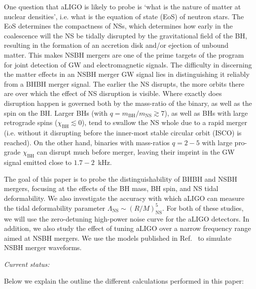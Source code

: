 \documentclass[aps,prd,amsmath,floats,floatfix, twocolumn,
superscriptaddress,nofootinbib,showpacs]{revtex4-1}
\newcommand{\prayush}{\textcolor{red!40!black}}
\newcommand{\NS}{\mathrm{NS}}
\begin{document}
One question that aLIGO is likely to probe is `what is the nature of
matter at nuclear densities', i.e. what is the equation of state (EoS) of 
neutron stars. The EoS determines the compactness of NSs, which
determines how early in the coalescence will the NS be tidally disrupted
by the gravitational field of the BH, resulting in the formation
of an accretion disk and/or ejection of unbound matter. This makes NSBH
mergers are one of the prime targets of the program for joint detection of
GW and electromagnetic signals. 
% 
The difficulty in discerning the matter effects in an NSBH merger GW signal
lies in distinguishing it reliably from a BHBH merger signal. The earlier the
NS disrupts, the more orbits there are over which the effect of NS disruption
is visible. Where exactly does disruption happen is governed both by the 
mass-ratio of the binary, as well as the spin on the BH. Larger BHs (with
$q=m_\mathrm{BH}/m_\mathrm{NS}\gtrsim 7$), as well as BHs with large retrograde
spins ($\chi_\mathrm{BH} \lesssim 0$), tend to swallow the NS whole due to a
rapid merger (i.e. without it disrupting before the inner-most stable circular
orbit (ISCO) is reached). On the other hand, binaries with mass-ratios 
$q=2-5$ with large pro-grade $\chi_\mathrm{BH}$ can disrupt much before 
merger, leaving their imprint in the GW signal emitted close to $1.7-2$~kHz.
% 

The goal of this paper is to probe the distinguishability of BHBH and NSBH
mergers, focusing at the effects of the BH mass, BH spin, and NS tidal 
deformability. We also investigate the accuracy with which aLIGO can measure
the tidal deformability parameter $\Lambda_\NS\sim(R/M)^5_\NS$. For both of 
these studies, we will use the zero-detuning high-power noise curve for the
aLIGO detectors. \prayush{In addition, we also study the effect of tuning aLIGO
over a narrow frequency range aimed at NSBH mergers.}
We use the models published in Ref.~\cite{Lackey:2013axa,Pannarale:2015jka} to
simulate NSBH merger waveforms.



\vspace{2cm}

\textit{\prayush{Current status:}}

Below we explain the outline the different calculations performed in this 
paper:
\end{document}
